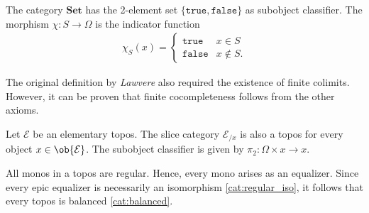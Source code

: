     \begin{example}
        The category $\mathbf{Set}$ has the 2-element set $\{\texttt{true},\texttt{false}\}$ as subobject classifier. The morphism $\chi:S\rightarrow\Omega$ is the indicator function
        \begin{gather}
            \chi_S(x)=
            \begin{cases}
                \texttt{true}&x\in S\\
                \texttt{false}&x\not\in S.
            \end{cases}
        \end{gather}
    \end{example}

    \begin{remark}
        The original definition by \textit{Lawvere} also required the existence of finite colimits. However, it can be proven that finite cocompleteness follows from the other axioms.
    \end{remark}

    \begin{theorem}
        Let $\mathcal{E}$ be an elementary topos. The slice category $\mathcal{E}_{/x}$ is also a topos for every object $x\in\ob{\mathcal{E}}$. The subobject classifier is given by $\pi_2:\Omega\times x\rightarrow x$.
    \end{theorem}

    \begin{property}[Balanced]
        All monos in a topos are regular. Hence, every mono arises as an equalizer. Since every epic equalizer is necessarily an isomorphism \ref{cat:regular_iso}, it follows that every topos is balanced \ref{cat:balanced}.
    \end{property}

